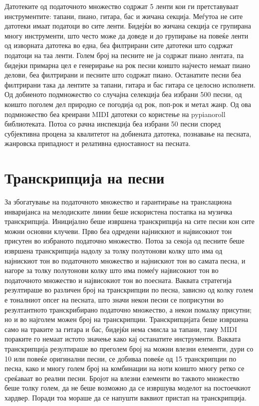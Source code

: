 Датотеките од податочното множество содржат 5 ленти кои ги претставуваат инструментите: тапани, пиано, гитара, бас и жичана секција. Меѓутоа не сите датотеки имаат податоци во сите ленти. Бидејќи во жичана секција се групирана многу инструменти, што често може да доведе и до групирање на повеќе ленти од изворната датотека во една, беа филтрирани сите датотеки што содржат податоци на таа ленти. Голем број на песните не ја содржат пиано лентата, па бидејки примарна цел е генерирање на рок песни коишто најчесто немаат пиано делови, беа филтрирани и песните што содржат пиано. Останатите песни беа филтрирани така да лентите за тапани, гитара и бас гитара се целосно исполнети. Од добиеното подмножество со случајна селекција беа избрани 500 песни, од коишто поголем дел природно се погодија од рок, поп-рок и метал жанр. Од ова подмножество беа креирани MIDI датотеки со користење на pypianoroll библиотеката. Потоа со рачна инспекција беа избрани 50 песни според субјективна процена за квалитетот на добиената датотека, познавање на песната, жанровска припадност и релативна едноставност на песната.

\section{Транскрипција на песни}

За збогатување на податочното множество и гарантирање на транслациона инваријанса на мелодиските линии беше искористена постапка на музичка транскрипција. Иницијално беше извршена транскрипција на сите песни кон сите можни основни клучеви. Прво беа одредени најнискиот и највисокиот тон присутен во избраното податочно множество. Потоа за секоја од песните беше извршена транскрипција надолу за толку полутонови колку што има од најнискиот тон во податочното множество и најнискиот тон во самата песна, и нагоре за толку полутонови колку што има помеѓу највисокиот тон во податочното множество и највисокиот тон во поесната. Ваквата стратегија резултираше во различен број на транскрипции по песна, зависно од колку голем е тоналниот опсег на песната, што значи некои песни се поприсутни во резултантното транскрибирано податочно множество, а некои помалку присутни; но и во најголем можен број на транскрипции. Транскрипцијата беше извршена само на траките за гитара и бас, бидејќи нема смисла за тапани, таму MIDI пораките го немаат истото значење како кај останатите инструменти. Ваквата транскрипција резултираше во преголем број на можни влезни елементи, дури со 10 или повеќе оригинални песни, се добиваа повеќе од 15 транскрипции по песна, како и многу голем број на комбинации на ноти коишто многу ретко се среќаваат во реални песни. Бројот на влезни елементи во таквото множество беше толку голем, да не беше возможно да се извршува моделот на постоечкиот хардвер. Поради тоа мораше да се напушти ваквиот пристап на транскрипција. 

